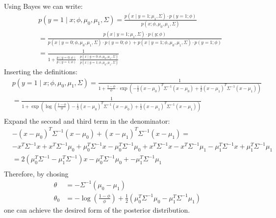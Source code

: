 \begin{answer}    
Using Bayes we can write:
\begin{align*}
&p(y=1 \mid x;\phi,\mu_0,\mu_1,\Sigma) = \frac{p(x\mid y=1; \mu_1, \Sigma)\cdot p(y=1;\phi) } {p(x;\phi,\mu_0,\mu_1,\Sigma)} \\
&= \frac{p(x\mid y=1; \mu_1, \Sigma)\cdot p(y;\phi) } {p(x \mid y=0;\phi,\mu_0,\mu_1,\Sigma)\cdot p(y=0;\phi) + p(x \mid y=1;\phi,\mu_0,\mu_1,\Sigma)\cdot p(y=1;\phi)} \\
&= \frac{1}{1 + \frac{p(y=0;\phi)}{p(y=1;\phi)}\cdot \frac{p(x \mid y=0;\phi,\mu_0,\mu_1,\Sigma)}{p(x \mid y=1;\phi,\mu_0,\mu_1,\Sigma)}}   
\end{align*}
Inserting the definitions:
\begin{align*}
&p(y=1 \mid x;\phi,\mu_0,\mu_1,\Sigma) = \frac{1}{1+ \frac{1-\phi}{\phi} \cdot \exp\left(-\frac{1}{2}(x-\mu_{0})^T \Sigma^{-1} (x-\mu_{0}) + \frac{1}{2}(x-\mu_{1})^T \Sigma^{-1} (x-\mu_{1})\right)} \\
&= \frac{1}{1+ \exp\left(\log\left(\frac{1-\phi}{\phi}\right)-\frac{1}{2}(x-\mu_{0})^T \Sigma^{-1} (x-\mu_{0})+\frac{1}{2}(x-\mu_{1})^T \Sigma^{-1} (x-\mu_{1})\right)} \\
\end{align*}
Expand the second and third term in the denominator:
\begin{align*}
&-(x-\mu_{0})^T \Sigma^{-1} (x-\mu_{0})+(x-\mu_{1})^T \Sigma^{-1} (x-\mu_{1})  = \\
& -x^T\Sigma^{-1} x + x^T\Sigma^{-1}\mu_0 + \mu_0^T\Sigma^{-1} x - \mu_0^T\Sigma^{-1}\mu_0 + x^T\Sigma^{-1} x - x^T\Sigma^{-1}\mu_1 - \mu_1^T\Sigma^{-1} x + \mu_1^T\Sigma^{-1}\mu_1 \\
&= 2 (\mu_0^T\Sigma^{-1} - \mu_1^T\Sigma^{-1})x - \mu_0^T\Sigma^{-1}\mu_0  + - \mu_1^T\Sigma^{-1}\mu_1 \\
\end{align*}
Therefore, by chosing
\begin{align*}
    \theta &= -\Sigma^{-1} (\mu_0 - \mu_1) \\
    \theta_0 &= - \log\left(\frac{1-\phi}{\phi}\right) + \frac{1}{2}\left(\mu_0^T\Sigma^{-1}\mu_0   - \mu_1^T\Sigma^{-1}\mu_1\right)
\end{align*}
one can achieve the desired form of the posterior distribution.
\end{answer}
